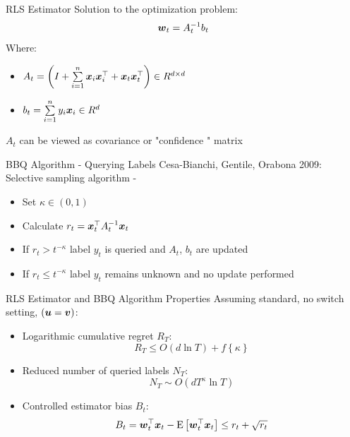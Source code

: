 \documentclass{beamer}
\begin{document}
\begin{frame}{RLS Estimator}
Solution to the optimization problem:
\begin{equation}
{\boldsymbol{w}}_{t}=A_{t}^{-1}b_t
\label{RLS2}
\end{equation}
Where:\newline
\begin{itemize} 
\item $A_t=\left(I+\sum\limits_{i=1}^{n}{\boldsymbol{x}}_{i} {{\boldsymbol{x}}}^{\top}_{i}+ {\boldsymbol{x}}_{t} {{\boldsymbol{x}}}^{\top}_{t}\right)\in R^{d\times d}$\newline
\item $b_t=\sum\limits_{i=1}^{n}y_i{\boldsymbol{x}}_{i}\in R^d$ \newline
\end{itemize}
$A_t$ can be viewed as covariance or "confidence " matrix
\end{frame}

\begin{frame}{BBQ Algorithm - Querying Labels}
Cesa-Bianchi, Gentile, Orabona 2009:
\newline\newline
Selective sampling algorithm -\newline
\begin{itemize}
\item Set $\kappa\in\left(0,1\right)$\newline
\item Calculate $r_t={{\boldsymbol{x}}}^{\top}_{t}A_{t}^{-1}{\boldsymbol{x}}_{t}$\newline
\item  If $r_t> t^{-\kappa}$ label $y_t$ is queried and $A_t$, $b_t$ are updated\newline
\item If $r_t\leq t^{-\kappa}$  label $y_t$ remains unknown and no update performed
\end{itemize}
\end{frame}

\begin{frame}{RLS Estimator and  BBQ Algorithm Properties}
Assuming standard, no switch setting, $\left({\boldsymbol{u}}={\boldsymbol{v}}\right)$:\newline
\begin{itemize}
\item Logarithmic cumulative regret $R_T$:
\begin{equation*}
 R_T\leq O\left(d\ln{T}\right)+f\left\{\kappa\right\}
\end{equation*}
\item Reduced number of queried labels $N_T$:
\begin{equation*}
N_T\sim O\left(dT^{\kappa}\ln{T}\right)
\end{equation*}
\item Controlled estimator bias $B_t$:
\begin{equation*}
B_t={{\boldsymbol{w}}}^{\top}_{t}{\boldsymbol{x}}_{t}-{\rm E}\left[{{{\boldsymbol{w}}}^{\top}_{t}{\boldsymbol{x}}_{t}}\right]\leq r_t+\sqrt{r_t}
\end{equation*}
\end{itemize} 
\end{frame}
\end{document}

